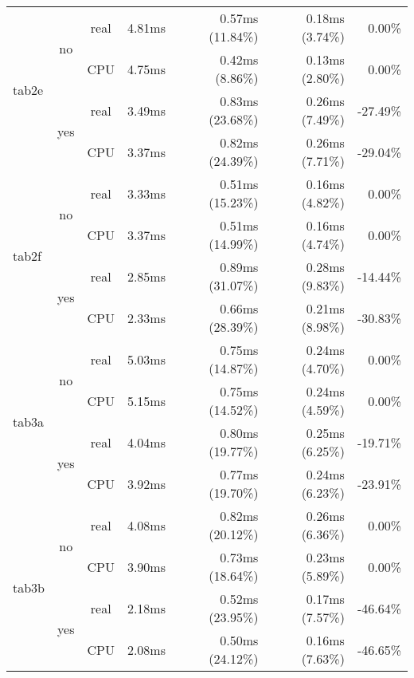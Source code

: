 \documentclass[en]{pracamgr}
\begin{document}
\begin{small}
\begin{longtable}{|l|c|c|r|r|r|r|}
\hline
\multirow{4}{*}{tab2e}    & \multirow{2}{*}{no}  & real & 4.81ms & 0.57ms (11.84\%) & 0.18ms (3.74\%) & 0.00\% \\*
                          &                      & CPU  & 4.75ms & 0.42ms (8.86\%) & 0.13ms (2.80\%) & 0.00\% \\*
                          \cline{2-7}
                          & \multirow{2}{*}{yes} & real & 3.49ms & 0.83ms (23.68\%) & 0.26ms (7.49\%) & -27.49\% \\*
                          &                      & CPU  & 3.37ms & 0.82ms (24.39\%) & 0.26ms (7.71\%) & -29.04\% \\
\hline
\multirow{4}{*}{tab2f}    & \multirow{2}{*}{no}  & real & 3.33ms & 0.51ms (15.23\%) & 0.16ms (4.82\%) & 0.00\% \\*
                          &                      & CPU  & 3.37ms & 0.51ms (14.99\%) & 0.16ms (4.74\%) & 0.00\% \\*
                          \cline{2-7}
                          & \multirow{2}{*}{yes} & real & 2.85ms & 0.89ms (31.07\%) & 0.28ms (9.83\%) & -14.44\% \\*
                          &                      & CPU  & 2.33ms & 0.66ms (28.39\%) & 0.21ms (8.98\%) & -30.83\% \\
\hline
\multirow{4}{*}{tab3a}    & \multirow{2}{*}{no}  & real & 5.03ms & 0.75ms (14.87\%) & 0.24ms (4.70\%) & 0.00\% \\*
                          &                      & CPU  & 5.15ms & 0.75ms (14.52\%) & 0.24ms (4.59\%) & 0.00\% \\*
                          \cline{2-7}
                          & \multirow{2}{*}{yes} & real & 4.04ms & 0.80ms (19.77\%) & 0.25ms (6.25\%) & -19.71\% \\*
                          &                      & CPU  & 3.92ms & 0.77ms (19.70\%) & 0.24ms (6.23\%) & -23.91\% \\
\hline
\multirow{4}{*}{tab3b}    & \multirow{2}{*}{no}  & real & 4.08ms & 0.82ms (20.12\%) & 0.26ms (6.36\%) & 0.00\% \\*
                          &                      & CPU  & 3.90ms & 0.73ms (18.64\%) & 0.23ms (5.89\%) & 0.00\% \\*
                          \cline{2-7}
                          & \multirow{2}{*}{yes} & real & 2.18ms & 0.52ms (23.95\%) & 0.17ms (7.57\%) & -46.64\% \\*
                          &                      & CPU  & 2.08ms & 0.50ms (24.12\%) & 0.16ms (7.63\%) & -46.65\% \\

\end{longtable}
\end{small}
\end{document}
